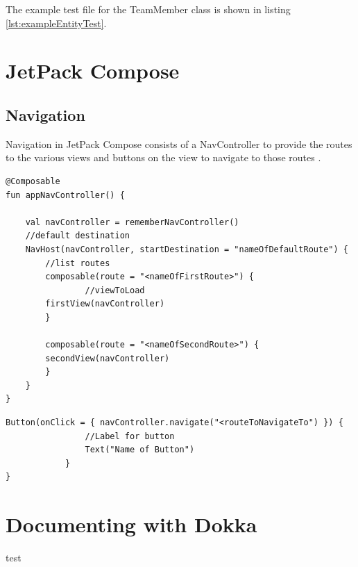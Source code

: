 \documentclass[12pt]{article}
\begin{document}
The example test file for the TeamMember class is shown in listing \ref{lst:exampleEntityTest}. 


\section{JetPack Compose}

\subsection{Navigation}
Navigation in JetPack Compose consists of a NavController to provide the routes to the various views and buttons on the view to navigate to those routes \cite{mediumJetpackNavigation} \cite{NavigationCodeLab}. 



\begin{lstlisting}[numbers=none, 
			caption=Function to create a simple Nav Controller,
			label={lst:navControllerFunction}]
@Composable
fun appNavController() {

    val navController = rememberNavController()
    //default destination
    NavHost(navController, startDestination = "nameOfDefaultRoute") {
    	//list routes
        composable(route = "<nameOfFirstRoute>") {
        	    //viewToLoad
	    firstView(navController)
        }
        
        composable(route = "<nameOfSecondRoute>") {
	    secondView(navController)
        }
    }
}
\end{lstlisting}


\begin{lstlisting}[numbers=none, 
			caption=Button to navigate to a view,
			label={lst:navButton}]
Button(onClick = { navController.navigate("<routeToNavigateTo") }) {
                //Label for button
                Text("Name of Button")
            }
}
\end{lstlisting}

\section{Documenting with Dokka}
test
\begin{appendix}
  \listoffigures
  \listoftables
  \lstlistoflistings

\end{appendix}
  
\end{document}
